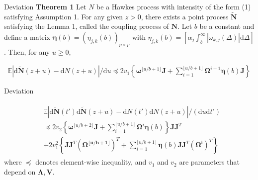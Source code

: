 \documentclass{beamer}		%
\newcommand{\dd}{\mathrm{d}}
\begin{document}
\begin{frame}{Deviation}
\textbf{Theorem 1} Let $N$ be a Hawkes process with intensity of the form (1) satisfying Assumption 1. For any given $z > 0$, there exists a point process $\tilde{\bm{N}}$ satisfying the Lemma 1, called the coupling process of $\bm{N}$. Let $b$ be a constant and define a matrix $\bm{\eta}(b) = (\eta_{j,k}(b))_{p \times p}$ with $\eta_{j,k}(b) = [\alpha_j \int_b^\infty |\omega_{k,j}(\Delta)| \dd \Delta]$. Then, for any $u \ge 0$,

\begin{align}
\mathbb{E} \left|\dd \bm{\tilde{N}}(z+u) - \dd N(z+u)\right| /\dd u \preceq 2v_1 \left\{\bm{\omega}^{\lfloor u/b+1 \rfloor}\bm{J} + \sum_{i=1}^{\lfloor u/b+1 \rfloor} \bm{\Omega}^{i-1} \bm{\eta}(b) \bm{J}  \right\}
\end{align}


\end{frame}







\begin{frame}{Deviation}


\begin{align}
\begin{split}
&\mathbb{E} \left|\dd \bm{\tilde{N}}(t') \dd \bm{\tilde{N}}(z+u) - \dd N(t') \dd N(z+u)\right| / (\dd u \dd t') \\
&\preceq 2v_2 \left\{\bm{\omega}^{\lfloor u/b+2 \rfloor}\bm{J} + \sum_{i=1}^{\lfloor u/b+1 \rfloor} \bm{\Omega}^{i} \bm{\eta}(b) \right\} \bm{J}\bm{J}^T \\
&+ 2v_1^2 \left\{ \bm{J}\bm{J}^T(\bm{\Omega^{\lfloor u/b+1 \rfloor}})^T + \sum_{i=1}^{\lfloor u/b+1 \rfloor} \bm{\eta}(b)\bm{J}\bm{J}^T(\bm{\Omega^i})^T \right\}
\end{split}
\end{align}
where $\preceq$ denotes element-wise inequality, and $v_1$ and $v_2$ are parameters that depend on $\bm{\Lambda, V}$.

\end{frame}
\end{document}
